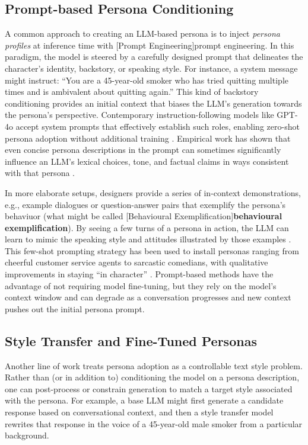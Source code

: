 \subsection{Prompt-based Persona Conditioning} 
A common approach to creating an LLM-based persona is to inject \emph{persona profiles} at inference time with [Prompt Engineering]prompt engineering. In this paradigm, the model is steered by a carefully designed prompt that delineates the character's identity, backstory, or speaking style. For instance, a system message might instruct: ``You are a 45-year-old smoker who has tried quitting multiple times and is ambivalent about quitting again.'' This kind of backstory conditioning provides an initial context that biases the LLM's generation towards the persona’s perspective. Contemporary instruction-following models like GPT-4o accept system prompts that effectively establish such roles, enabling zero-shot persona adoption without additional training \cite{10.5555/3600270.3602281}. Empirical work has shown that even concise persona descriptions in the prompt can sometimes significantly influence an LLM's lexical choices, tone, and factual claims in ways consistent with that persona \cite{madotto-etal-2019-personalizing, liu-etal-2024-evaluating-large}.

In more elaborate setups, designers provide a series of in-context demonstrations, e.g., example dialogues or question-answer pairs that exemplify the persona's behaviuor (what might be called [Behavioural Exemplification]\textbf{behavioural exemplification}). By seeing a few turns of a persona in action, the LLM can learn to mimic the speaking style and attitudes illustrated by those examples \cite{joshi-etal-2023-persona}. This few-shot prompting strategy has been used to install personas ranging from cheerful customer service agents to sarcastic comedians, with qualitative improvements in staying ``in character'' \cite{gururangan-etal-2020-dont, yang-etal-2023-large}. Prompt-based methods have the advantage of not requiring model fine-tuning, but they rely on the model's context window and can degrade as a conversation progresses and new context pushes out the initial persona prompt.

\subsection{Style Transfer and Fine-Tuned Personas} 
Another line of work treats persona adoption as a controllable text style problem. Rather than (or in addition to) conditioning the model on a persona description, one can post-process or constrain generation to match a target style associated with the persona. For example, a base LLM might first generate a candidate response based on conversational context, and then a style transfer model rewrites that response in the voice of a 45-year-old male smoker from a particular background.

